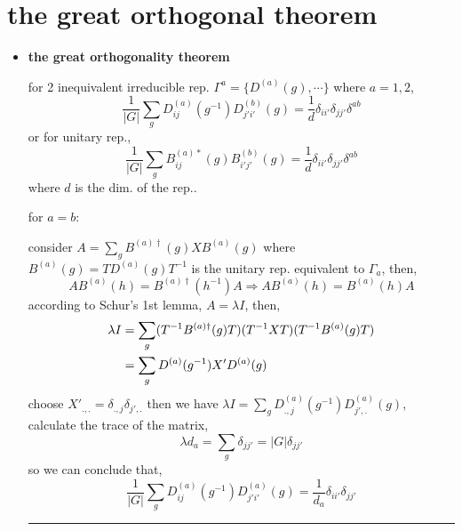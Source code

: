 \section{the great orthogonal theorem}
\begin{itemize}
	\item \textbf{the great orthogonality theorem}
	
	for 2 inequivalent irreducible rep. $\Gamma^{a} = \{D^{(a)}(g), \cdots\}$ where $a = 1, 2$,
	\begin{equation}
		\frac{1}{|G|} \sum_g D^{(a)}_{i j}(g^{-1}) D^{(b)}_{j' i'}(g) = \frac{1}{d} \delta_{i i'} \delta_{j j'} \delta^{a b}
	\end{equation}
	or for unitary rep.,
	\begin{equation}
		\frac{1}{|G|} \sum_g B^{(a) *}_{i j}(g) B^{(b)}_{i' j'}(g) = \frac{1}{d} \delta_{i i'} \delta_{j j'} \delta^{a b}
	\end{equation}
	where $d$ is the dim. of the rep..
	
	\begin{tcolorbox}[title=proof:]
		for $a = b$:
		
		consider $A = \sum_g B^{(a) \dagger}(g) X B^{(a)}(g)$ where $B^{(a)}(g) = T D^{(a)}(g) T^{-1}$ is the unitary rep. equivalent to $\Gamma_a$, then,
		\begin{equation}
			A B^{(a)}(h) = B^{(a) \dagger}(h^{-1}) A \Longrightarrow A B^{(a)}(h) = B^{(a)}(h) A
		\end{equation}
		according to Schur’s 1st lemma, $A = \lambda I$, then,
		\begin{align}
			\lambda I &= \sum_g (T^{-1} B^{(a) \dagger}(g) T) (T^{-1} X T) (T^{-1} B^{(a)}(g) T) \notag \\
			&= \sum_g D^{(a)}(g^{-1}) X' D^{(a)}(g)
		\end{align}
		choose $X'_{.,.} = \delta_{.,j} \delta_{j',.}$ then we have $\lambda I = \sum_g D^{(a)}_{.,j}(g^{-1}) D^{(a)}_{j',.}(g)$, calculate the trace of the matrix,
		\begin{equation}
			\lambda d_a = \sum_g \delta_{j j'} = |G| \delta_{j j'}
		\end{equation}
		so we can conclude that,
		\begin{equation}
			\frac{1}{|G|} \sum_g D^{(a)}_{i j}(g^{-1}) D^{(a)}_{j' i'}(g) = \frac{1}{d_a} \delta_{i i'} \delta_{j j'}
		\end{equation}
		
		\noindent\rule[0.5ex]{\linewidth}{0.5pt} %
		

\end{tcolorbox}
\end{itemize}
